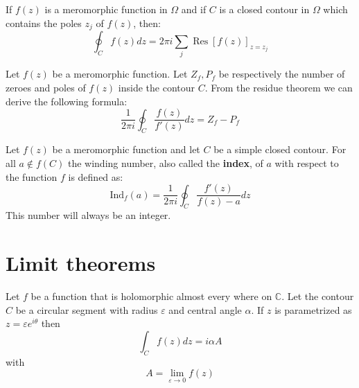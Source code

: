 	\begin{theorem}\label{complexcalculus:residue_theorem}
		If $f(z)$ is a meromorphic function in $\Omega$ and if $C$ is a closed contour in $\Omega$ which contains the poles $z_j$ of $f(z)$, then:
		\begin{equation}
                	\boxed{\oint_Cf(z)dz = 2\pi i\sum_j \operatorname{Res}\left[f(z)\right]_{z=z_j}}
		\end{equation}
	\end{theorem}
    
	\begin{formula}
		Let $f(z)$ be a meromorphic function. Let $Z_f, P_f$ be respectively the number of zeroes and poles of $f(z)$ inside the contour $C$. From the residue theorem we can derive the following formula:
		\begin{equation}
			\frac{1}{2\pi i}\oint_C\frac{f(z)}{f'(z)}dz = Z_f - P_f
		\end{equation}
	\end{formula}
	\begin{formula}
		Let $f(z)$ be a meromorphic function and let $C$ be a simple closed contour. For all $a\not\in f(C)$ the winding number, also called the \textbf{index}, of $a$ with respect to the function $f$ is defined as:
		\begin{equation}
			\text{Ind}_f(a) = \frac{1}{2\pi i}\oint_C\frac{f'(z)}{f(z) - a}dz
		\end{equation}
		This number will always be an integer.
	\end{formula}

\section{Limit theorems}

    	\begin{theorem}\label{complexcalculus:theorem:small_limit}
		Let $f$ be a function that is holomorphic almost every where on $\mathbb{C}$. Let the contour $C$ be a circular segment with radius $\varepsilon$ and central angle $\alpha$.
		If $z$ is parametrized as $z = \varepsilon e^{i\theta}$ then\[\int_Cf(z)dz = i\alpha A\] with \[A = \lim_{\varepsilon\rightarrow0}f(z)\]
	\end{theorem}
	
